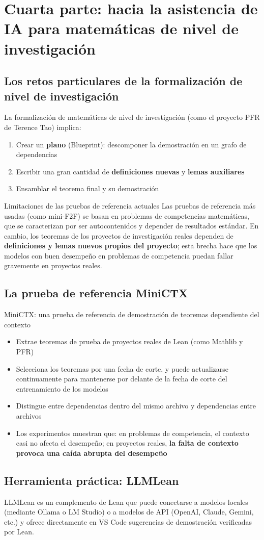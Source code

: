 \section{Cuarta parte: hacia la asistencia de IA para matemáticas de nivel de investigación}

\subsection{Los retos particulares de la formalización de nivel de investigación}

La formalización de matemáticas de nivel de investigación (como el proyecto PFR de Terence Tao) implica:
\begin{enumerate}
    \item Crear un \textbf{plano} (Blueprint): descomponer la demostración en un grafo de dependencias
    \item Escribir una gran cantidad de \textbf{definiciones nuevas} y \textbf{lemas auxiliares}
    \item Ensamblar el teorema final y su demostración
\end{enumerate}

\begin{warningbox}{Limitaciones de las pruebas de referencia actuales}
Las pruebas de referencia más usadas (como mini-F2F) se basan en problemas de competencias matemáticas, que se caracterizan por ser autocontenidos y depender de resultados estándar. En cambio, los teoremas de los proyectos de investigación reales dependen de \textbf{definiciones y lemas nuevos propios del proyecto}; esta brecha hace que los modelos con buen desempeño en problemas de competencia puedan fallar gravemente en proyectos reales.
\end{warningbox}

\subsection{La prueba de referencia MiniCTX}

\begin{importantbox}{MiniCTX: una prueba de referencia de demostración de teoremas dependiente del contexto}
\begin{itemize}
    \item Extrae teoremas de prueba de proyectos reales de Lean (como Mathlib y PFR)
    \item Selecciona los teoremas por una fecha de corte, y puede actualizarse continuamente para mantenerse por delante de la fecha de corte del entrenamiento de los modelos
    \item Distingue entre dependencias dentro del mismo archivo y dependencias entre archivos
    \item Los experimentos muestran que: en problemas de competencia, el contexto casi no afecta el desempeño; en proyectos reales, \textbf{la falta de contexto provoca una caída abrupta del desempeño}
\end{itemize}
\end{importantbox}

\subsection{Herramienta práctica: LLMLean}

LLMLean es un complemento de Lean que puede conectarse a modelos locales (mediante Ollama o LM Studio) o a modelos de API (OpenAI, Claude, Gemini, etc.) y ofrece directamente en VS Code sugerencias de demostración verificadas por Lean.
